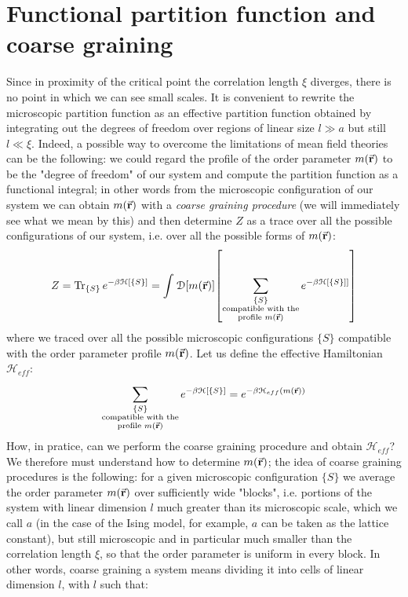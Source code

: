 \documentclass[../main/main.tex]{subfiles}
\begin{document}
\section{Functional partition function and coarse graining}

Since in proximity of the critical point the correlation length \( \xi  \) diverges, there is no point in which we can see small scales. It is convenient to rewrite the microscopic partition function as an effective partition function obtained by integrating out the degrees of freedom over regions of linear size \( l \gg a \) but still \( l \ll \xi  \). Indeed, a possible way to overcome the limitations of mean field theories can be the following: we could regard the profile of the order parameter \( m (\va{r}) \) to be the "degree of freedom" of our system and compute the partition function as a functional integral; in other words from the microscopic configuration of our system we can obtain \( m (\va{r}) \) with a \emph{coarse graining procedure} (we will immediately see what we mean by this) and then determine \( Z \) as a trace over all the possible configurations of our system, i.e. over all the possible forms of \( m(\va{r}) \):
\begin{equation}
  Z = \Tr_{\{ S \}  } e^{- \beta \mathcal{H} [ \{ S \}  ]}
  = \int_{}^{} \mathcal{D}{\qty[m(\va{r})] } \qty[\sum_{ \substack{ \{ S \} \\ \text{compatible with the} \\ \text{profile } m(\va{r})}   }^{} e^{- \beta \mathcal{H} [ \{ S \}  ]] } ]
\end{equation}
where we traced over all the possible microscopic configurations \( \{ S \}   \) compatible with the order parameter profile \( m(\va{r}) \).
Let us define the effective Hamiltonian \( \mathcal{H}_{eff} \):
\begin{equation}
\sum_{ \substack{ \{ S \} \\ \text{compatible with the} \\ \text{profile } m(\va{r})}   }^{} e^ {- \beta \mathcal{H} [ \{ S \}  ]}
= e^{-\beta \mathcal{H}_{eff} (m (\va{r}))}
\label{eq:17_7}
\end{equation}
How, in pratice, can we perform the coarse graining procedure and obtain \( \mathcal{H}_{eff} \)?
We therefore must understand how to determine \( m(\va{r}) \); the idea of coarse graining procedures is the following: for a given microscopic configuration \( \{ S \}   \)  we average the order parameter \( m(\va{r}) \)  over sufficiently wide "blocks", i.e. portions of the system with linear dimension \( l \) much greater than its microscopic scale, which we call \( a \) (in the case of the Ising model, for example, \( a \)  can be taken as the lattice constant), but still microscopic and in particular much smaller than the correlation length \( \xi \), so that the order parameter is uniform in every block. In other words, coarse graining a system means dividing it into cells of linear dimension \( l \),  with \( l \) such that:
\end{document}
